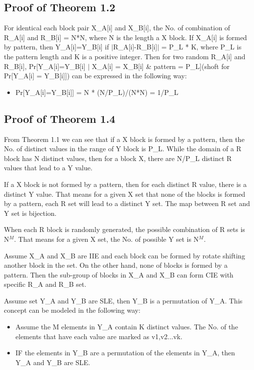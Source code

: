 \documentclass{article}
\begin{document}
\subsection{Proof of Theorem 1.2}
For identical each block pair X\_A[i] and X\_B[i], the No. of combination of R\_A[i] and R\_B[i] = N*N, where N is the length a X block. 
If X\_A[i] is formed by pattern, then Y\_A[i]=Y\_B[i] if $\mid$R\_A[i]-R\_B[i]$\mid$ = P\_L * K, where P\_L is the pattern length and K is a positive integer. 
Then for two random R\_A[i] and R\_B[i], Pr[Y\_A[i]=Y\_B[i] $\mid$ X\_A[i] = X\_B[i] \& pattern = P\_L](shoft for Pr[Y\_A[i] = Y\_B[i]]) can be expressed in the following way:
\begin{itemize}
	\item Pr[Y\_A[i]=Y\_B[i]] = N * (N/P\_L)/(N*N) = 1/P\_L
\end{itemize} 

\subsection{Proof of Theorem 1.4}
From Theorem 1.1 we can see that if a X block is formed by a pattern, then the No. of distinct values in the range of Y block is P\_L. While the domain of a R block has N distinct values, then for a block X, there are N/P\_L distinct R values that lead to a Y value.

If a X block is not formed by a pattern, then for each distinct R value, there is a distinct Y value. That means for a given X set that none of the blocks is formed by a pattern, each R set will lead to a distinct Y set. The map between R set and Y set is bijection.

When each R block is randomly generated, the possible combination of R sets is N$^M$. That means for a given X set, the No. of possible Y set is N$^M$.

Assume X\_A and X\_B are IIE and each block can be formed by rotate shifting another block in the set. On the other hand, none of blocks is formed by a pattern. Then the sub-group of blocks in X\_A and X\_B can form CIE with specific R\_A and R\_B set. 

Assume set Y\_A and Y\_B are SLE, then Y\_B is a permutation of Y\_A. This concept can be modeled in the following way:
\begin{itemize}
	\item Assume the M elements in Y\_A contain K distinct values. The No. of the elements that have each value are marked as v1,v2...vk.
	\item IF the elements in Y\_B are a permutation of the elements in Y\_A, then Y\_A and Y\_B are SLE.
\end{itemize}
\end{document}
